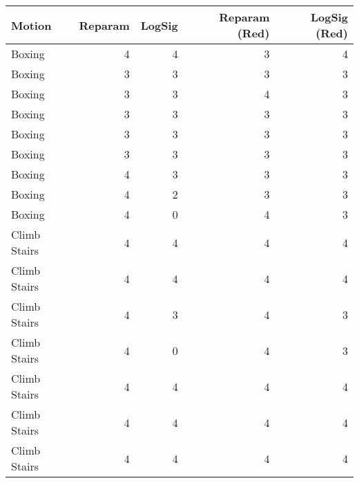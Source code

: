 \begin{tabular}{lrrrr}
\toprule
Motion & Reparam & LogSig & Reparam (Red) & LogSig (Red) \\
\midrule
Boxing & 4 & 4 & 3 & 4 \\
Boxing & 3 & 3 & 3 & 3 \\
Boxing & 3 & 3 & 4 & 3 \\
Boxing & 3 & 3 & 3 & 3 \\
Boxing & 3 & 3 & 3 & 3 \\
Boxing & 3 & 3 & 3 & 3 \\
Boxing & 4 & 3 & 3 & 3 \\
Boxing & 4 & 2 & 3 & 3 \\
Boxing & 4 & 0 & 4 & 3 \\
Climb Stairs & 4 & 4 & 4 & 4 \\
Climb Stairs & 4 & 4 & 4 & 4 \\
Climb Stairs & 4 & 3 & 4 & 3 \\
Climb Stairs & 4 & 0 & 4 & 3 \\
Climb Stairs & 4 & 4 & 4 & 4 \\
Climb Stairs & 4 & 4 & 4 & 4 \\
Climb Stairs & 4 & 4 & 4 & 4 \\
\bottomrule
\end{tabular}
